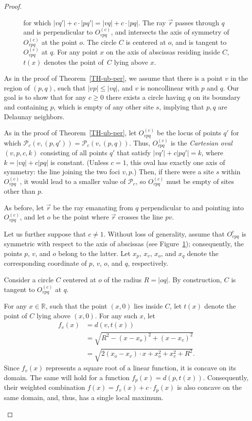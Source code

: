 \documentclass[10pt, conference, compsocconf]{IEEEtran}
\def\PP{{\mathcal P}}
\begin{document}
\begin{proof}
\begin{itemize}
\begin{figure}
{      for which $|vq'|+c\cdot |pq'|=|vq|+c\cdot |pq|$. The ray $\vec{r}$
      passes through $q$ and is perpendicular to $O_{vpq}^{(c)}$,
      and intersects the axis of symmetry of $O_{vpq}^{(c)}$ at the point $o$.
      The circle $C$ is centered at $o$, and is tangent to $O_{vpq}^{(c)}$ at
      $q$.
      For any point $x$ on the axis of abscissas residing inside $C$, $t(x)$
      denotes the point of~$C$ lying above $x$.}
      \label{fig:oval}
   \end{figure}
      As in the proof of Theorem~\ref{TH-ub-per}, we assume that there
      is a point $v$ in the region of $(p,q)$, such that $|vp|\le |vq|$, and
      $v$ is noncollinear with $p$ and $q$.
      Our goal is to show that for any $c \geq 0$ there exists a circle
      having $q$ on its boundary and containing $p$, which is empty of any
      other site $s$, implying that $p,q$ are Delaunay neighbors.

      As in the proof of Theorem~\ref{TH-ub-per}, let $O^{(c)}_{vpq}$ be
      the locus of points $q'$ for which $\PP_c(v,(p,q'))=\PP_c(v,(p,q))$.
      Thus, $O^{(c)}_{vpq}$ is the \emph{Cartesian oval} $(v,p,c,k)$
      consisting of all points $q'$ that satisfy $|vq'|+c|pq'|=k$, where
      $k=|vq|+c|pq|$ is constant.  (Unless $c=1$, this oval has exactly
      one axis of symmetry: the line joining the two foci $v,p$.)
      Then, if there were a site $s$ within $O^{(c)}_{vpq}$, it would lead
      to a smaller value of $\PP_c$, so $O^{(c)}_{vpq}$ must be empty of
      sites other than $p$.

      As before, let $\vec{r}$ be the ray emanating from $q$ perpendicular
      to and pointing into $O^{(c)}_{vpq}$, and let $o$ be the point where
      $\vec{r}$ crosses the line $pv$.

      Let us further suppose that $c\ne 1$. Without loss of generality,
      assume that $O_{vpq}^{c}$ is symmetric with respect to the axis of
      abscissas (see Figure~\ref{fig:oval}); consequently, the points $p$,
      $v$, and $o$ belong to the latter.  Let $x_p$, $x_v$, $x_o$, and $x_q$
      denote the corresponding coordinate of $p$, $v$, $o$, and $q$,
      respectively.

      Consider a circle $C$ centered at $o$ of the radius $R=|oq|$.  By
      construction, $C$ is tangent to $O_{vpq}^{(c)}$ at $q$.

      For any $x\in \mathbb{R}$, such that the point $(x,0)$ lies inside
      $C$, let $t(x)$ denote the point of $C$ lying above $(x,0)$.  For any
      such $x$, let
      \begin{align*}
      f_v(x)&=d(v,t(x))\\
            &=\sqrt{R^2-(x-x_o)^2+(x-x_v)^2}\\
            &=\sqrt{2(x_o-x_v)\cdot x +x_o^2+x_v^2+R^2}.
      \end{align*}
      Since $f_v(x)$ represents a square root of a linear function,
      it is concave on its domain.  The same will hold for a function
      $f_p(x)=d(p,t(x))$.  Consequently, their weighted combination
      $f(x)=f_v(x)+c\cdot f_p(x)$ is also concave on the same domain, and,
      thus, has a single local maximum.


\end{itemize}
\end{proof}
\end{document}

